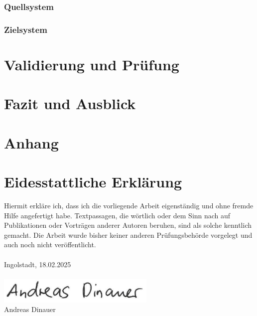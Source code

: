 \documentclass[10pt]{article}
\begin{document}
\subsubsection{Quellsystem}
\subsubsection{Zielsystem}
\subsection{}
\section{Validierung und Prüfung}
\section{Fazit und Ausblick}
\section{Anhang}
\newpage

\section*{Eidesstattliche Erklärung}
Hiermit erkläre ich, dass ich die vorliegende Arbeit eigenständig und ohne fremde Hilfe angefertigt habe. Textpassagen, die wörtlich oder dem Sinn nach auf Publikationen oder Vorträgen anderer Autoren beruhen, sind als solche kenntlich gemacht. Die Arbeit wurde bisher keiner anderen Prüfungsbehörde vorgelegt und auch noch nicht veröffentlicht.\\\\
Ingolstadt, 18.02.2025\\\\
\includegraphics[scale=0.6]{dateien/unterschrift.png}\\
Andreas Dinauer
\end{document}
